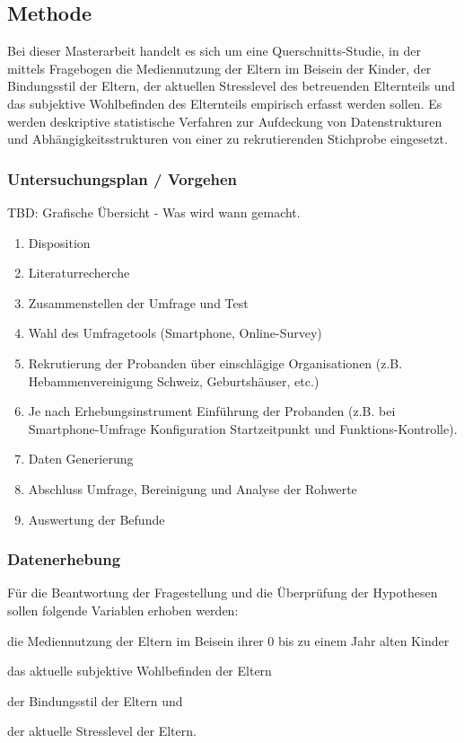 \subsection{Methode}
Bei dieser Masterarbeit handelt es sich um eine Querschnitts-Studie, in der mittels Fragebogen die Mediennutzung der Eltern im Beisein der Kinder, der Bindungsstil der Eltern, der aktuellen Stresslevel des betreuenden Elternteils und das subjektive Wohlbefinden des Elternteils empirisch erfasst werden sollen. 
Es werden deskriptive statistische Verfahren zur Aufdeckung von Datenstrukturen und Abhängigkeitsstrukturen von einer zu rekrutierenden Stichprobe eingesetzt.
\subsubsection{Untersuchungsplan / Vorgehen}
TBD: Grafische Übersicht - Was wird wann gemacht.
\begin{enumerate}
    \item Disposition
    \item Literaturrecherche
    \item Zusammenstellen der Umfrage und Test
    \item Wahl des Umfragetools (Smartphone, Online-Survey)
    \item Rekrutierung der Probanden über einschlägige Organisationen (z.B. Hebammenvereinigung Schweiz, Geburtshäuser, etc.)
    \item Je nach Erhebungsinstrument Einführung der Probanden (z.B. bei Smartphone-Umfrage Konfiguration Startzeitpunkt und Funktions-Kontrolle).
    \item Daten Generierung
    \item Abschluss Umfrage, Bereinigung und Analyse der Rohwerte
    \item Auswertung der Befunde
\end{enumerate}
\subsubsection{Datenerhebung}
Für die Beantwortung der Fragestellung und die Überprüfung der Hypothesen sollen folgende Variablen erhoben werden: 
\begin{seriate}
    \item die Mediennutzung der Eltern im Beisein ihrer 0 bis zu einem Jahr alten Kinder
    \item das aktuelle subjektive Wohlbefinden der Eltern
    \item der Bindungsstil der Eltern und
    \item der aktuelle Stresslevel der Eltern.
\end{seriate}

